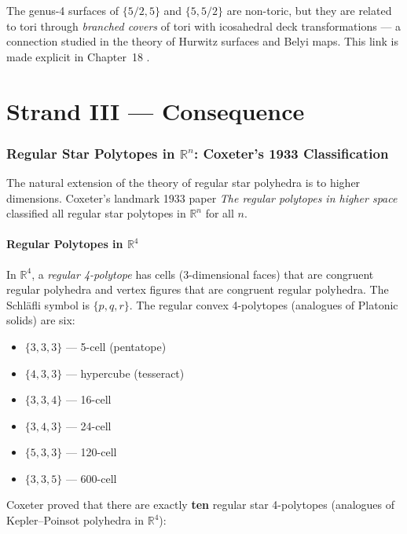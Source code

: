 The genus-4 surfaces of $\{5/2,5\}$ and $\{5,5/2\}$ are
non-toric, but they are related to tori through
\emph{branched covers} of tori with icosahedral deck
transformations — a connection studied in the theory of
Hurwitz surfaces and Belyi maps.  This link is made explicit
in Chapter~18 \cite{cromwell_polyhedra}.

\part*{Strand III — Consequence}

\section{Regular Star Polytopes in \texorpdfstring{$\mathbb{R}^n$}{Rn}: Coxeter's 1933 Classification}
\label{sec:coxeter-classification}

The natural extension of the theory of regular star polyhedra
is to higher dimensions.  Coxeter's landmark 1933 paper
\emph{The regular polytopes in higher space}
\cite{coxeter_regular_polytopes} classified all regular star polytopes
in $\mathbb{R}^n$ for all $n$.

\subsection{Regular Polytopes in \texorpdfstring{$\mathbb{R}^4$}{R4}}
\label{ssec:regular-polytopes-r4}

In $\mathbb{R}^4$, a \emph{regular 4-polytope} has cells
(3-dimensional faces) that are congruent regular polyhedra
and vertex figures that are congruent regular polyhedra.
The Schläfli symbol is $\{p,q,r\}$.  The regular convex
4-polytopes (analogues of Platonic solids) are six:
\begin{itemize}
  \item $\{3,3,3\}$ — 5-cell (pentatope)
  \item $\{4,3,3\}$ — hypercube (tesseract)
  \item $\{3,3,4\}$ — 16-cell
  \item $\{3,4,3\}$ — 24-cell
  \item $\{5,3,3\}$ — 120-cell
  \item $\{3,3,5\}$ — 600-cell
\end{itemize}

Coxeter proved \cite{coxeter_regular_polytopes} that there are
exactly \textbf{ten} regular star 4-polytopes (analogues of
Kepler–Poinsot polyhedra in $\mathbb{R}^4$):

